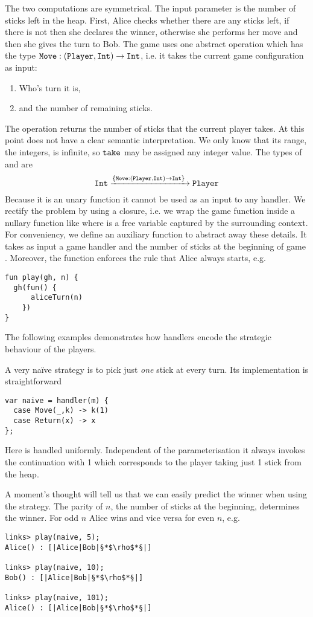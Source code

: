 The two computations are symmetrical. The input parameter  is the number of sticks left in the heap. First, Alice checks whether there are any sticks left, if there is not then she declares  the winner, otherwise she performs her move and then she gives the turn to Bob.
The game uses one abstract operation  which has the type $\texttt{Move} : (\texttt{Player}, \texttt{Int}) \to \texttt{Int}$, i.e. it takes the current game configuration as input:
\begin{enumerate}
  \item Who's turn it is,
  \item and the number of remaining sticks.
\end{enumerate} 
The operation  returns the number of sticks that the current player takes. At this point  does not have a clear semantic interpretation. We only know that its range, the integers, is infinite, so $\texttt{take}$ may be assigned any integer value.
The types of  and  are
\[ \texttt{Int} \xrightarrow{\{\texttt{Move}:(\texttt{Player},\texttt{Int}) \to \texttt{Int}\}\;} \texttt{Player} \]
Because it is an unary function it cannot be used as an input to any handler. We rectify the problem by using a closure, i.e. we wrap the game function inside a nullary function like  where  is a free variable captured by the surrounding context.
For conveniency, we define an auxiliary function  to abstract away these details. It takes as input a game handler  and the number of sticks at the beginning of game . Moreover, the function  enforces the rule that Alice always starts, e.g.
\begin{lstlisting}[style=links]
fun play(gh, n) {
  gh(fun() {
      aliceTurn(n)
    })
}
\end{lstlisting}
The following examples demonstrates how handlers encode the strategic behaviour of the players.
\begin{example}\label{ex:nim-naive}
A very naïve strategy is to pick just \emph{one} stick at every turn.
Its implementation is straightforward
\begin{lstlisting}[style=links]
var naive = handler(m) {
  case Move(_,k) -> k(1)
  case Return(x) -> x
};
\end{lstlisting}
Here  is handled uniformly. Independent of the parameterisation it always invokes the continuation  with 1 which corresponds to the player taking just 1 stick from the heap.

A moment's thought will tell us that we can easily predict the winner when using the  strategy. The parity of $n$, the number of sticks at the beginning, determines the winner. For odd $n$ Alice wins and vice versa for even $n$, e.g.
\begin{lstlisting}
links> play(naive, 5);
Alice() : [|Alice|Bob|§*$\rho$*§|]

links> play(naive, 10);
Bob() : [|Alice|Bob|§*$\rho$*§|]

links> play(naive, 101);
Alice() : [|Alice|Bob|§*$\rho$*§|]
\end{lstlisting} 
\end{example}

